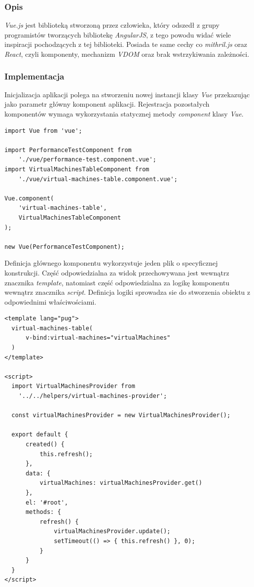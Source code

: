 \documentclass[polish, twoside, 12pt]{mwart}
\begin{document}
\subsubsection{Opis}

\emph{Vue.js} jest biblioteką stworzoną przez człowieka, który odszedł z grupy programistów tworzących bibliotekę \emph{AngularJS}, z tego powodu widać wiele inspiracji pochodzących z tej biblioteki.
Posiada te same cechy co \emph{mithril.js} oraz \emph{React}, czyli komponenty, mechanizm \emph{VDOM} oraz brak wstrzykiwania zależności.

\subsubsection{Implementacja}

Inicjalizacja aplikacji polega na stworzeniu nowej instancji klasy \emph{Vue} przekazując jako parametr główny komponent aplikacji. Rejestracja pozostałych komponentów wymaga wykorzystania statycznej metody \emph{component} klasy \emph{Vue}.

\begin{lstlisting}[caption=Inicjalizacja głównego komponentu]
import Vue from 'vue';

import PerformanceTestComponent from
    './vue/performance-test.component.vue';
import VirtualMachinesTableComponent from
    './vue/virtual-machines-table.component.vue';

Vue.component(
    'virtual-machines-table',
    VirtualMachinesTableComponent
);

new Vue(PerformanceTestComponent);
\end{lstlisting}

Definicja głównego komponentu wykorzystuje jeden plik o specyficznej konstrukcji. Część odpowiedzialna za widok przechowywana jest wewnątrz znacznika \emph{template}, natomiast część odpowiedzialna za logikę komponentu wewnątrz znacznika \emph{script}. Definicja logiki sprowadza sie do stworzenia obiektu z odpowiednimi właściwościami.

\begin{lstlisting}[caption=Główny komponent]
<template lang="pug">
  virtual-machines-table(
      v-bind:virtual-machines="virtualMachines"
  )
</template>

<script>
  import VirtualMachinesProvider from
    '../../helpers/virtual-machines-provider';

  const virtualMachinesProvider = new VirtualMachinesProvider();

  export default {
      created() {
          this.refresh();
      },
      data: {
          virtualMachines: virtualMachinesProvider.get()
      },
      el: '#root',
      methods: {
          refresh() {
              virtualMachinesProvider.update();
              setTimeout(() => { this.refresh() }, 0);
          }
      }
  }
</script>
\end{lstlisting}
\end{document}
